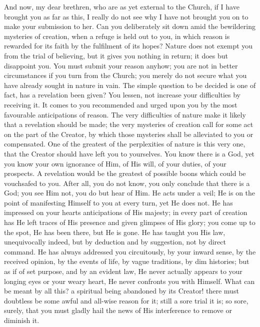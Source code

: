 And now, my dear brethren, who are as yet external to the Church,
if I have brought you as far as this, I really do not see why I have
not brought you on to make your submission to her. Can you
deliberately sit down amid the bewildering mysteries of creation, when
a refuge is held out to you, in which reason is rewarded for its faith
by the fulfilment of its hopes? Nature does not exempt you from the
trial of believing, but it gives you nothing in return; it does but
disappoint you. You must submit your reason anyhow; you are not in
better circumstances if you turn from the Church; you merely do not
secure what you have already sought in nature in vain. The simple
question to be decided is one of fact, has a revelation been given?
You lessen, not increase your difficulties by receiving it. It comes
to you recommended and urged upon you by the most favourable
anticipations of reason. The very difficulties of nature make it
likely that a revelation should be made; the very mysteries of
creation call for some act on the part of the Creator, by which those
mysteries shall be alleviated to you or compensated. One of the
greatest of the perplexities of nature is this very one, that the
Creator should have left you to yourselves. You know there is a God,
yet you know your own ignorance of Him, of His will, of your duties,
of your prospects. A revelation would be the greatest of possible
boons which could be vouchsafed to you. After all, you do not know,
you only conclude that there is a God; you see Him not, you do but
hear of Him. He acts under a veil; He is on the point of manifesting
Himself to you at every turn, yet He does not. He has impressed on
your hearts anticipations of His majesty; in every part of creation
has He left traces of His presence and given glimpses of His glory;
you come up to the spot, He has been there, but He is gone. He has
taught you His law, unequivocally indeed, but by deduction and by
suggestion, not by direct command. He has always addressed you
circuitously, by your inward sense, by the received opinion, by the
events of life, by vague traditions, by dim histories; but as if of
set purpose, and by an evident law, He never actually appears to your
longing eyes or your weary heart, He never confronts you with Himself.
What can be meant by all this? a spiritual being abandoned by its
Creator! there must doubtless be some awful and all-wise reason for
it; still a sore trial it is; so sore, surely, that you must gladly
hail the news of His interference to remove or diminish it.

